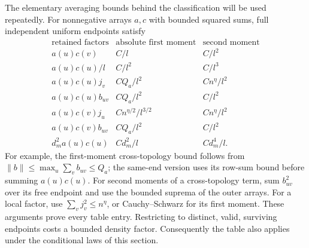 The elementary averaging bounds behind the classification will be used
repeatedly. For nonnegative arrays \(a,c\) with bounded squared sums,
full independent uniform endpoints satisfy
\[
\begin{array}{c|c|c}
\text{retained factors}&\text{absolute first moment}&
                       \text{second moment}\\ \hline
 a(u)c(v)&C/l&C/l^2\\
 a(u)c(u)/l&C/l^2&C/l^3\\
 a(u)c(u)j_v& C Q_a/l^2&C n^\eta/l^2\\
 a(u)c(u)b_{uv}& C Q_a/l^2&C/l^2\\
 a(u)c(v)j_u& C n^{\eta/2}/l^{3/2}&C n^\eta/l^2\\
 a(u)c(v)b_{uv}&C Q_a/l^2&C/l^2\\
 d_m^2a(u)c(u)&C d_m^2/l&C d_m^4/l.
\end{array}
\]
For example, the first-moment cross-topology bound follows from
\(\|b\|\le\max_u\sum_vb_{uv}\le Q_a\); the same-end version
uses its row-sum bound before summing \(a(u)c(u)\). For second
moments of a cross-topology term, sum \(b_{uv}^2\) over its free
endpoint and use the bounded suprema of the outer arrays. For a local
factor, use \(\sum_vj_v^2\le n^\eta\), or Cauchy--Schwarz for its
first moment. These arguments prove every table entry. Restricting
to distinct, valid, surviving endpoints costs a bounded density
factor. Consequently the table also applies under the conditional
laws of this section.

